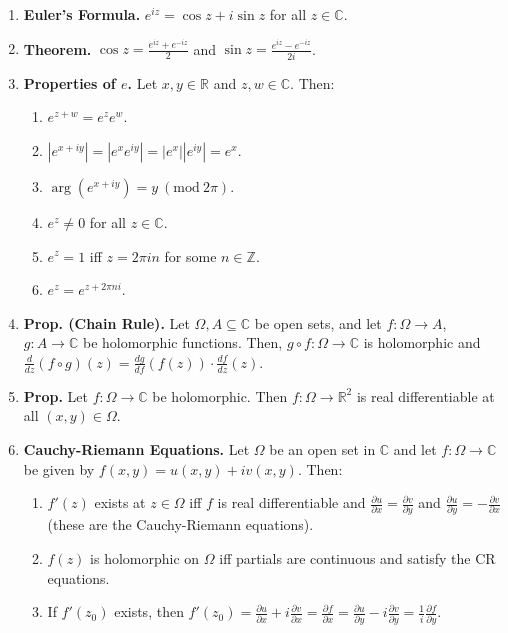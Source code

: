 \documentclass[10pt]{article}
\theoremstyle{definition}
\theoremstyle{named}
\newcommand{\Mod}[1]{\ (\mathrm{mod}\ #1)}
\begin{document}
\begin{enumerate}
    \item \textbf{Euler's Formula. } $e^{iz} = \cos z + i\sin z$ for all $z \in \mathbb{C}$. 
    \item \textbf{Theorem. } $\cos z = \frac{e^{iz} + e^{-iz}}{2}$ and $\sin z = \frac{e^{iz} - e^{-iz}}{2i}$. 
    \item \textbf{Properties of $e$. } Let $x,y \in \mathbb{R}$ and $z,w \in \mathbb{C}$. Then: 
    \begin{enumerate}
        \item $e^{z + w} = e^ze^w$. 
        \item $|e^{x + iy}| = |e^xe^{iy}| = |e^x||e^{iy}| = e^x$. 
        \item $\arg(e^{x + iy}) = y \Mod{2\pi}$. 
        \item $e^z \neq 0$ for all $z \in \mathbb{C}$. 
        \item $e^z = 1$ iff $z = 2\pi in$ for some $n \in \mathbb{Z}$. 
        \item $e^z = e^{z + 2\pi ni}$. 
    \end{enumerate} 
    \item \textbf{Prop. (Chain Rule). } Let $\Omega, A \subseteq \mathbb{C}$ be open sets, and let $f: \Omega \to A$, $g: A \to \mathbb{C}$ be holomorphic functions. Then, $g \circ f: \Omega \to \mathbb{C}$ is holomorphic and $\frac{d}{dz}(f \circ g)(z) = \frac{dg}{df}(f(z)) \cdot \frac{df}{dz}(z)$. 
    \item \textbf{Prop. } Let $f: \Omega \to \mathbb{C}$ be holomorphic. Then $f: \Omega \to \mathbb{R}^2$ is real differentiable at all $(x,y) \in \Omega$. 
    \item \textbf{Cauchy-Riemann Equations. } Let $\Omega$ be an open set in $\mathbb{C}$ and let $f: \Omega \to \mathbb{C}$ be given by $f(x,y) = u(x,y) + iv(x,y)$. Then: 
    \begin{enumerate}
        \item $f'(z)$ exists at $z \in \Omega$ iff $f$ is real differentiable and $\frac{\partial u}{\partial x} = \frac{\partial v}{\partial y}$ and $\frac{\partial u}{\partial y} = -\frac{\partial v}{\partial x}$ (these are the Cauchy-Riemann equations). 
        \item $f(z)$ is holomorphic on $\Omega$ iff partials are continuous and satisfy the CR equations. 
        \item If $f'(z_0)$ exists, then $f'(z_0) = \frac{\partial u}{\partial x} + i\frac{\partial v}{\partial x} = \frac{\partial f}{\partial x} = \frac{\partial u}{\partial y} - i\frac{\partial v}{\partial y} = \frac{1}{i}\frac{\partial f}{\partial y}$. 

\end{enumerate}
\end{enumerate}
\end{document}
